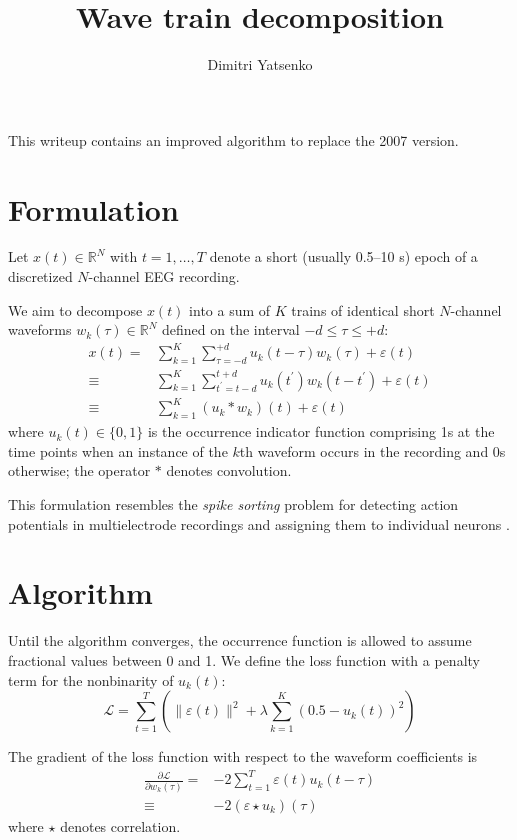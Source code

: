 \documentclass[10pt,twocolumn]{article}
\title{Wave train decomposition}
\author{Dimitri Yatsenko}
\newcommand{\R}{\mathbb R}
\begin{document}
\maketitle
This writeup contains an improved algorithm to replace the 2007 version. 

\section*{Formulation}
Let $x(t)\in \R^N$ with $t = 1,\ldots,T$ denote a short (usually 0.5--10 s) epoch of a discretized $N$-channel EEG recording.

We aim to decompose $x(t)$ into a sum of $K$ trains of identical short $N$-channel waveforms $w_k(\tau)\in \R^N$ defined on the interval $-d \le \tau \le +d$:
\begin{equation}
\begin{split}
x(t) = & 
\sum\limits_{k=1}^K \sum_{\tau=-d}^{+d} u_k(t-\tau)w_k(\tau) + \varepsilon(t)
\\
\equiv &
\sum\limits_{k=1}^K \sum_{t^\prime=t-d}^{t+d} u_k(t^\prime)w_k(t-t^\prime) + \varepsilon(t)
\\
\equiv &
\sum\limits_{k=1}^K (u_k*w_k)(t) + \varepsilon(t)
\end{split}
\end{equation}
where $u_k(t)\in \{0,1\}$ is the occurrence indicator function comprising 1s at the time points when an instance of the $k$th waveform occurs in the recording and 0s otherwise; the operator $*$ denotes convolution.

This formulation resembles the \emph{spike sorting} problem for detecting action potentials in multielectrode recordings and assigning them to individual neurons \cite{pillow_model-based_2013}.

\section*{Algorithm}
Until the algorithm converges, the occurrence function is allowed to assume fractional values between 0 and 1.
We define the loss function with a penalty term for the nonbinarity of $u_k(t)$:
\begin{equation}
\mathcal L = 
\sum\limits_{t=1}^T\left(\|\varepsilon(t)\|^2 
+ \lambda \sum\limits_{k=1}^K \left(0.5-u_k(t)\right)^2\right) 
\end{equation}

The gradient of the loss function with respect to the waveform coefficients is 
\begin{equation}
\begin{split}
\frac{\partial \mathcal L}{\partial w_k(\tau)} 
= & -2\sum\limits_{t=1}^T \varepsilon(t) u_k(t-\tau)
\\
\equiv & -2 (\varepsilon\star u_k)(\tau)
\end{split}
\end{equation}
where $\star$ denotes correlation.
\end{document}
